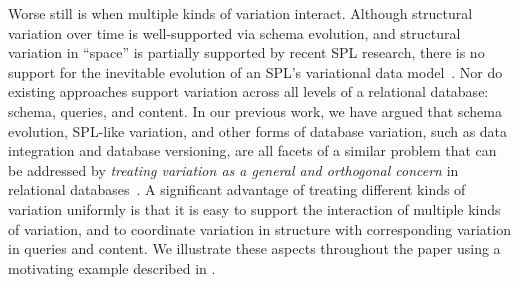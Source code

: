 


Worse still is when multiple kinds of variation interact. Although structural
variation over time is well-supported via schema evolution, and structural
variation in ``space'' is partially supported by recent SPL research, there is
no support for the inevitable evolution of an SPL's variational data
model~\cite{dbSPLevolve}. Nor do existing approaches support variation across
all levels of a relational database: schema, queries, and content.
%
In our previous work, we have argued that schema evolution, SPL-like variation,
and other forms of database variation, such as data integration and database
versioning, are all facets of a similar problem that can be addressed by
\emph{treating variation as a general and orthogonal concern} in relational
databases~\cite{ATW17dbpl,ATW18poly,ALW21vamos}.
%
A significant advantage of treating different kinds of variation uniformly is
that it is easy to support the interaction of multiple kinds of variation, and
to coordinate variation in structure with corresponding variation in queries
and content. We illustrate these aspects throughout the paper using a
motivating example described in .

